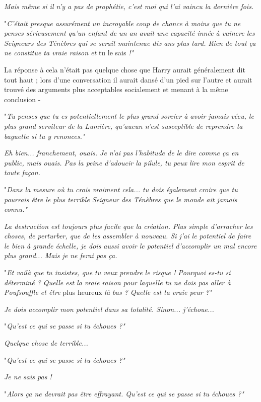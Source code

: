 \emph{Mais même si il n'y a pas de prophétie, c'est moi qui l'ai vaincu la dernière fois.} 

"\emph{C'était presque assurément un incroyable coup de chance à moins que tu ne penses sérieusement qu'un enfant de un an avait une capacité innée à vaincre les Seigneurs des Ténèbres qui se serait maintenue dix ans plus tard. Rien de tout ça ne constitue ta vraie raison et } tu le sais\emph{ !"} 

La réponse à cela n'était pas quelque chose que Harry aurait généralement dit tout haut ; lors d'une conversation il aurait dansé d'un pied sur l'autre et aurait trouvé des arguments plus acceptables socialement et menant à la même conclusion -

"\emph{Tu penses que tu es potentiellement le plus grand sorcier à avoir jamais vécu, le plus grand serviteur de la Lumière, qu'aucun n'est susceptible de reprendre ta baguette si tu y renonces."} 

\emph{Eh bien... franchement, ouais. Je n'ai pas l'habitude de le dire comme ça en public, mais ouais. Pas la peine d'adoucir la pilule, tu peux lire mon esprit de toute façon.} 

"\emph{Dans la mesure où tu crois vraiment cela... tu dois également croire que tu pourrais être le plus terrible Seigneur des Ténèbres que le monde ait jamais connu."} 

\emph{La destruction est toujours plus facile que la création. Plus simple d'arracher les choses, de perturber, que de les assembler à nouveau. Si j'ai le potentiel de faire le bien à grande échelle, je dois aussi avoir le potentiel d'accomplir un mal encore plus grand... Mais je ne ferai pas ça.} 

"\emph{Et voilà que tu insistes, que tu veux prendre le risque ! Pourquoi es-tu si déterminé ? Quelle est la vraie raison pour laquelle tu ne dois pas aller à Poufsouffle et être } plus heureux\emph{ là bas ? Quelle est ta vraie peur ?"} 

\emph{Je dois accomplir mon potentiel dans sa totalité. Sinon... j'échoue...} 

"\emph{Qu'est ce qui se passe si tu échoues ?"} 

\emph{Quelque chose de terrible...} 

"\emph{Qu'est ce qui se passe si tu échoues ?"} 

\emph{Je ne sais pas !} 

"\emph{Alors ça ne devrait pas être effrayant. Qu'est ce qui se passe si tu échoues ?"} 

